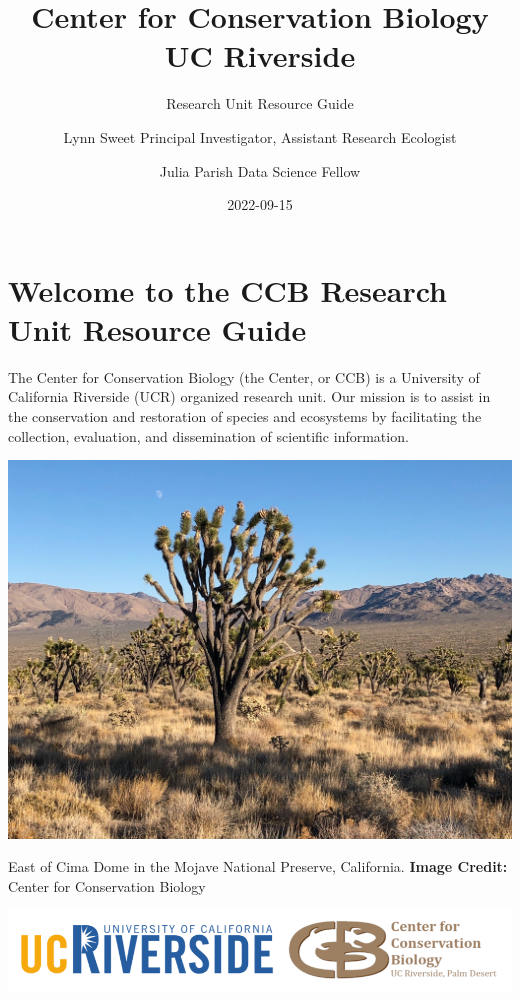 \documentclass[
]{book}
\title{Center for Conservation Biology \textbar{} UC Riverside}
\subtitle{Research Unit Resource Guide}
\author{Lynn Sweet \textbar{} Principal Investigator, Assistant Research Ecologist \and Julia Parish \textbar{} Data Science Fellow}
\date{2022-09-15}
\begin{document}
\maketitle

{
\setcounter{tocdepth}{1}
\tableofcontents
}
\hypertarget{welcome-to-the-ccb-research-unit-resource-guide}{%
\chapter*{Welcome to the CCB Research Unit Resource Guide}\label{welcome-to-the-ccb-research-unit-resource-guide}}

The Center for Conservation Biology (the Center, or CCB) is a University of California Riverside (UCR) organized research unit. Our mission is to assist in the conservation and restoration of species and ecosystems by facilitating the collection, evaluation, and dissemination of scientific information.

\includegraphics{images/cima2019}

East of Cima Dome in the Mojave National Preserve, California.
\textbf{Image Credit:} Center for Conservation Biology

\begin{center}\includegraphics{images/ucrccb} \end{center}
\end{document}
